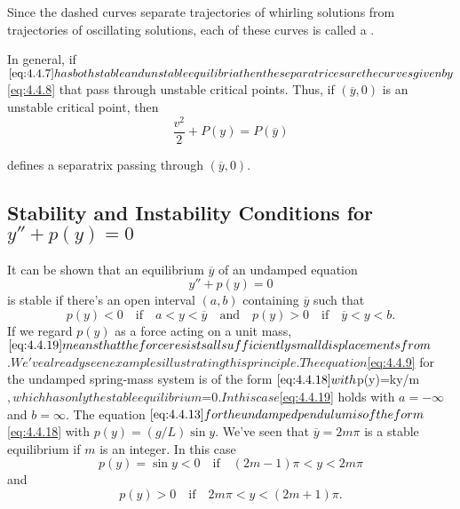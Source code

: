 \documentclass{ximera}
\begin{document}
\begin{example}
Since the dashed curves separate trajectories of whirling solutions
from trajectories of oscillating solutions, each of these curves is
called a .
 
In general, if $\eqref{eq:4.4.7} has both stable and unstable equilibria
then the separatrices are the curves given by $\eqref{eq:4.4.8} that pass
through unstable critical points. Thus, if $(\overline{y},0)$ is an
unstable critical point, then
\begin{equation} \label{eq:4.4.17}
\frac{v^2}{2}+P(y)=P(\overline{y})
\end{equation}
 
defines a separatrix passing through $(\overline{y},0)$.
\end{example}
 
\subsection*{Stability  and Instability Conditions for $y''+p(y)=0$}
 
It can be shown %
that an equilibrium
$\overline{y}$ of an undamped equation
\begin{equation} \label{eq:4.4.18}
y''+p(y)=0
\end{equation}
is stable if there's an open interval $(a,b)$ containing $\overline
y$ such that
\begin{equation} \label{eq:4.4.19}
p(y)<0 \quad\mbox{if}\quad a<y<\overline{y}\quad\mbox{and}\quad p(y)>0 \quad\mbox{if}\quad
\overline{y}<y<b.
\end{equation}
If we regard $p(y)$ as a force acting on a unit mass,
$\eqref{eq:4.4.19} means that the force resists all sufficiently small
displacements from $$.
 
 
We've already seen examples illustrating this principle. The equation
$\eqref{eq:4.4.9} for the undamped spring-mass system is of the form
$\eqref{eq:4.4.18} with $p(y)=ky/m$, which has only the stable equilibrium
$=0$. In this case $\eqref{eq:4.4.19} holds with $a=-\infty$ and
$b=\infty$. The equation $\eqref{eq:4.4.13} for the undamped pendulum is of
the form $\eqref{eq:4.4.18} with $p(y)=(g/L)\sin y$. We've seen that
$\overline{y}=2m\pi$ is a stable equilibrium if $m$ is an integer. In
this case
$$
p(y)=\sin y<0
\quad\mbox{if}\quad(2m-1)\pi<y<2m\pi
$$
and
$$
p(y)>0 \quad\mbox{if}\quad 2m\pi<y<(2m+1)\pi.
$$
 
\end{document}
